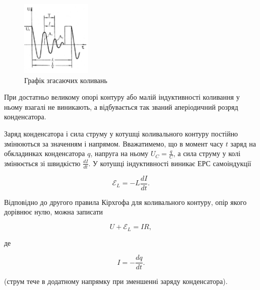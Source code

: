 \documentclass[12pt,a4paper]{article}
\begin{document}
    \begin{figure}[h!]

        \renewcommand{\thefigure}{3.\arabic{figure}} %

        \centering
        \includegraphics[width=0.3\textwidth]{3.3.png}
        \caption{Графік згасаючих коливань}
        \label{fig3:schema}

    \end{figure}

    При достатньо великому опорі контуру або малій індуктивності коливання у ньому взагалі не виникають,
    а відбувається так званий аперіодичний розряд конденсатора.

    Заряд конденсатора і сила струму у котушці коливального контуру постійно змінюються
    за значенням і напрямом. Вважатимемо, що в момент часу $t$ заряд на обкладинках
    конденсатора $q$, напруга на ньому $\displaystyle U_C = \frac{q}{C}$, а сила струму у колі
    змінюється зі швидкістю $\displaystyle \frac{dI}{dt}$. У котушці індуктивності виникає ЕРС самоіндукції

    \begin{equation}
        \mathcal{E}_L = -L\frac{dI}{dt}.
        \tag{3.1}
    \end{equation}

    Відповідно до другого правила Кірхгофа для коливального контуру, опір якого дорівнює нулю, можна записати

    \begin{equation}
        U + \mathcal{E}_L = IR,
        \tag{3.2}
    \end{equation}

    де

    \begin{equation}
        I = -\frac{dq}{dt}.
        \tag{3.3}
    \end{equation}

    (струм тече в додатному напрямку при зменшенні заряду конденсатора).
\end{document}
